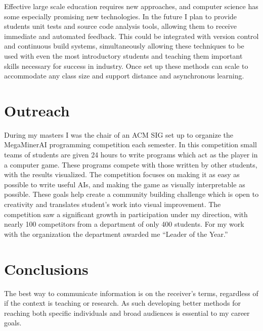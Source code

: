 \documentclass[a4paper, 11pt]{article}
\begin{document}
Effective large scale education requires new approaches,
and computer science has some especially promising new
technologies. In the future I plan to provide students
unit tests and source code analysis tools, allowing them
to receive immediate and automated feedback. This could
be integrated with version control and continuous build systems,
simultaneously allowing these techniques to be used with even
the most introductory students and teaching them important
skills necessary for success in industry. Once set up these
methods can scale to accommodate any class size and support
distance and asynchronous learning.

\section{Outreach}
During my masters I was the chair of an ACM SIG set up to organize
the MegaMinerAI programming competition each semester.
In this competition small teams of students are given
24 hours to write programs which act as the player in a computer game.
These programs compete with those written by other students,
with the results visualized. The competition focuses on making
it as easy as possible to write useful AIs, and making the game
as visually interpretable as possible. These goals help create
a community building challenge which is open to creativity and
translates student’s work into visual improvement.
The competition saw a significant growth in participation under
my direction, with nearly 100 competitors from a department of
only 400 students. For my work with the organization the department
awarded me “Leader of the Year.”

\section{Conclusions}
The best way to communicate information is on the receiver's
terms, regardless of if the context is teaching or research.
As such developing better methods for reaching both specific
individuals and broad audiences is essential to my career goals.
\end{document}

